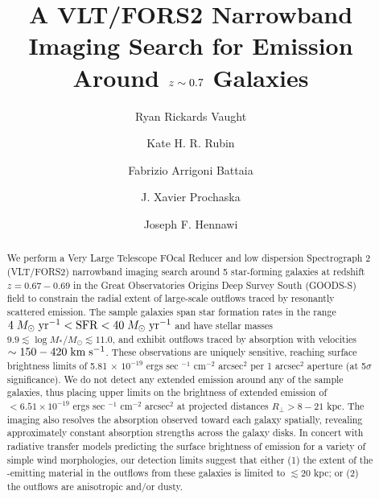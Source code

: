 \documentclass[twocolumn]{aastex62}
\def \mkms {{\rm \; km\;s^{-1}}}
\def \msunperyr {{\; M_{\odot}\rm \;yr^{-1}}}
\begin{document}
\title{A VLT/FORS2 Narrowband Imaging Search for  Emission Around $\lowercase{z}\sim0.7$ Galaxies }
\author{Ryan Rickards Vaught}
 
 \author{Kate H. R. Rubin}
 
 \author{Fabrizio Arrigoni Battaia }

 \author{J. Xavier Prochaska}
 
\author{Joseph F. Hennawi}


\begin{abstract}
We perform a Very Large Telescope FOcal Reducer and low dispersion Spectrograph 2 (VLT/FORS2) narrowband imaging search around 5 star-forming galaxies at redshift $z=0.67-0.69$ in the Great Observatories Origins Deep Survey South (GOODS-S) field to constrain the radial extent of large-scale outflows traced by resonantly scattered  emission. The sample galaxies span star formation rates in the range $4\msunperyr< \mathrm{SFR} < 40\msunperyr$ and have stellar masses $9.9 \lesssim \log M_{*}/M_{\odot} \lesssim 11.0$, and exhibit outflows traced by  absorption with velocities $\sim150-420\mkms$.
These observations are uniquely sensitive, reaching surface brightness limits of 5.81 $\times$ $10^{-19}$ ergs sec $^{-1}$ cm$^{-2}$ arcsec$^2$ per 1 arcsec$^2$ aperture (at 5$\sigma$ significance).  We do not detect any extended emission around any of the sample galaxies, thus placing  upper limits on the brightness of extended  emission of $<6.51 \times 10^{-19}$ ergs sec $^{-1}$ cm$^{-2}$ arcsec$^2$ at projected distances $R_{\perp} > 8-21$ kpc. The imaging also resolves the  absorption observed toward each galaxy spatially, revealing approximately constant absorption strengths across the galaxy disks. 
In concert with radiative transfer models predicting the surface brightness of  emission for a variety of simple wind morphologies, our detection limits suggest that either (1) the extent of the -emitting material in the outflows from these galaxies is limited to $\lesssim 20$ kpc; or (2) the outflows are anisotropic and/or dusty.  
\end{abstract}
\end{document}
